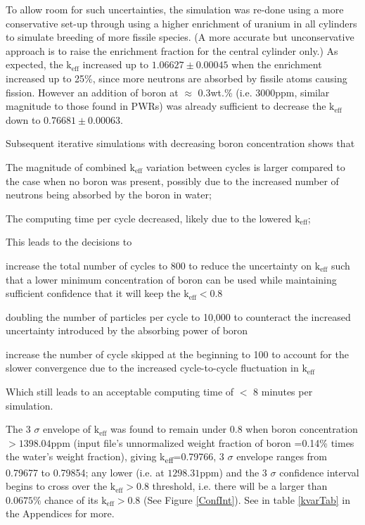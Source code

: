 \documentclass[a4paper, 11pt]{article}
\begin{document}
To allow room for such uncertainties, the simulation was re-done using a more conservative set-up through using a higher enrichment of uranium in all cylinders to simulate breeding of more fissile species. (A more accurate but unconservative approach is to raise the enrichment fraction for the central cylinder only.)
As expected, the $\text{k}_{\text{eff}}$ increased up to $1.06627 \pm 0.00045$ when the enrichment increased up to 25\%, since more neutrons are absorbed by fissile atoms causing fission. However an addition of boron at $\approx$ 0.3wt.\% (i.e. 3000ppm, similar magnitude to those found in PWRs) was already sufficient to decrease the $\text{k}_{\text{eff}}$ down to $0.76681 \pm 0.00063$.

Subsequent iterative simulations with decreasing boron concentration shows that
\begin{compactitem}\label{Ex3NumHist}
 	\item The magnitude of combined $\text{k}_{\text{eff}}$ variation between cycles is larger compared to the case when no boron was present, possibly due to the increased number of neutrons being absorbed by the boron in water;
	\item The computing time per cycle decreased, likely due to the lowered $\text{k}_{\text{eff}}$;
\end{compactitem} 
This leads to the decisions to 
\begin{compactitem}
	\item increase the total number of cycles to 800 to reduce the uncertainty on $\text{k}_{\text{eff}}$ such that a lower minimum concentration of boron can be used while maintaining sufficient confidence that it will keep the $\text{k}_{\text{eff}} < 0.8 $
	\item doubling the number of particles per cycle to 10,000 to counteract the increased uncertainty introduced by the absorbing power of boron
	\item increase the number of cycle skipped at the beginning to 100 to account for the slower convergence due to the increased cycle-to-cycle fluctuation in $\text{k}_{\text{eff}}$
\end{compactitem}
Which still leads to an acceptable computing time of $<$ 8 minutes per simulation.

The 3 $\sigma$ envelope of $\text{k}_{\text{eff}}$ was found to remain under 0.8 when boron concentration $>1398.04$ppm (input file's unnormalized weight fraction of boron =0.14\% times the water's weight fraction), giving k\textsubscript{eff}=0.79766, 3 $\sigma$ envelope ranges from 0.79677 to 0.79854; any lower (i.e. at $1298.31$ppm) and the 3 $\sigma$ confidence interval begins to cross over the $\text{k}_{\text{eff}}>0.8$ threshold, i.e. there will be a larger than $0.0675 \%$ chance of its $\text{k}_{\text{eff}} >0.8$ (See Figure \ref{ConfInt}). See in table \ref{kvarTab} in the Appendices for more.
\end{document}
